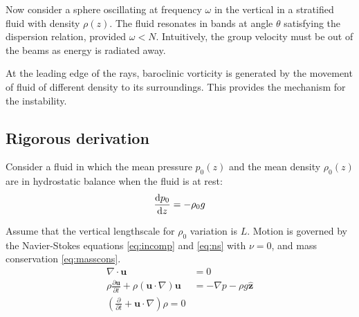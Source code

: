 \documentclass{jknotes}
\begin{document}
Now consider a sphere oscillating at frequency $\omega$ in the vertical in a
stratified fluid with density $\rho(z)$. The fluid resonates in bands at angle
$\theta$ satisfying the dispersion relation, provided $\omega < N$.
Intuitively, the group velocity must be out of the beams as energy is radiated
away.
\begin{center}
\end{center}

At the leading edge of the rays, baroclinic vorticity is generated by the
movement of fluid of different density to its surroundings. This provides the
mechanism for the instability.

\subsection{Rigorous derivation}
Consider a fluid in which the mean pressure $p_0(z)$ and the mean density
$\rho_0(z)$ are in hydrostatic balance when the fluid is at rest:
\begin{equation}
	\frac{\diffd p_0}{\diffd z} = - \rho_0 g
\end{equation}

Assume that the vertical lengthscale for $\rho_0$ variation is $L$. Motion is
governed by the Navier-Stokes equations \eqref{eq:incomp} and \eqref{eq:ns} with
$\nu = 0$, and mass conservation \eqref{eq:masscons}. 
\begin{align}
	\nabla \cdot \symbf{u} &= 0 \label{eq:incomp} \\
	\rho \frac{\partial \symbf{u}}{\partial t} + \rho
	(\symbf{u}\cdot\nabla)\symbf{u} &= - \nabla p - \rho g \hat{\symbf{z}}
	\label{eq:ns} \\
	\left(\frac{\partial}{\partial t} + \symbf{u}\cdot \nabla \right) \rho = 0
	\label{eq:masscons}
\end{align}
\end{document}

